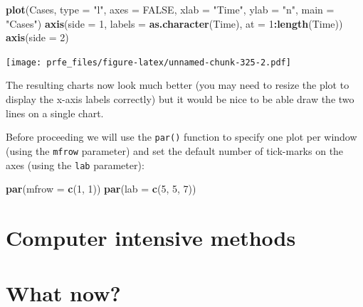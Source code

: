 \documentclass[12pt,]{book}
\newenvironment{Shaded}{\begin{snugshade}}{\end{snugshade}}
\newcommand{\KeywordTok}[1]{\textcolor[rgb]{0.13,0.29,0.53}{\textbf{#1}}}
\newcommand{\DataTypeTok}[1]{\textcolor[rgb]{0.13,0.29,0.53}{#1}}
\newcommand{\DecValTok}[1]{\textcolor[rgb]{0.00,0.00,0.81}{#1}}
\newcommand{\StringTok}[1]{\textcolor[rgb]{0.31,0.60,0.02}{#1}}
\newcommand{\OtherTok}[1]{\textcolor[rgb]{0.56,0.35,0.01}{#1}}
\newcommand{\OperatorTok}[1]{\textcolor[rgb]{0.81,0.36,0.00}{\textbf{#1}}}
\newcommand{\NormalTok}[1]{#1}
\theoremstyle{definition}
\theoremstyle{definition}
\theoremstyle{definition}
\theoremstyle{remark}
\begin{document}
\begin{Shaded}
\begin{Highlighting}[]
\KeywordTok{plot}\NormalTok{(Cases, }\DataTypeTok{type =} \StringTok{"l"}\NormalTok{, }\DataTypeTok{axes =} \OtherTok{FALSE}\NormalTok{, }\DataTypeTok{xlab =} \StringTok{"Time"}\NormalTok{, }\DataTypeTok{ylab =} \StringTok{"n"}\NormalTok{, }\DataTypeTok{main =} \StringTok{"Cases"}\NormalTok{)}
\KeywordTok{axis}\NormalTok{(}\DataTypeTok{side =} \DecValTok{1}\NormalTok{, }\DataTypeTok{labels =} \KeywordTok{as.character}\NormalTok{(Time), }\DataTypeTok{at =} \DecValTok{1}\OperatorTok{:}\KeywordTok{length}\NormalTok{(Time))}
\KeywordTok{axis}\NormalTok{(}\DataTypeTok{side =} \DecValTok{2}\NormalTok{)}
\end{Highlighting}
\end{Shaded}

\texttt{[image: prfe\_files/figure-latex/unnamed-chunk-325-2.pdf]}

The resulting charts now look much better (you may need to resize the
plot to display the x-axis labels correctly) but it would be nice to be
able draw the two lines on a single chart.

Before proceeding we will use the \texttt{par()} function to specify one
plot per window (using the \texttt{mfrow} parameter) and set the default
number of tick-marks on the axes (using the \texttt{lab} parameter):

\begin{Shaded}
\begin{Highlighting}[]
\KeywordTok{par}\NormalTok{(}\DataTypeTok{mfrow =} \KeywordTok{c}\NormalTok{(}\DecValTok{1}\NormalTok{, }\DecValTok{1}\NormalTok{))}
\KeywordTok{par}\NormalTok{(}\DataTypeTok{lab =} \KeywordTok{c}\NormalTok{(}\DecValTok{5}\NormalTok{, }\DecValTok{5}\NormalTok{, }\DecValTok{7}\NormalTok{))}
\end{Highlighting}
\end{Shaded}

\hypertarget{exercise9}{%
\chapter{Computer intensive methods}\label{exercise9}}

\hypertarget{whatnow}{%
\chapter{What now?}\label{whatnow}}


\end{document}
